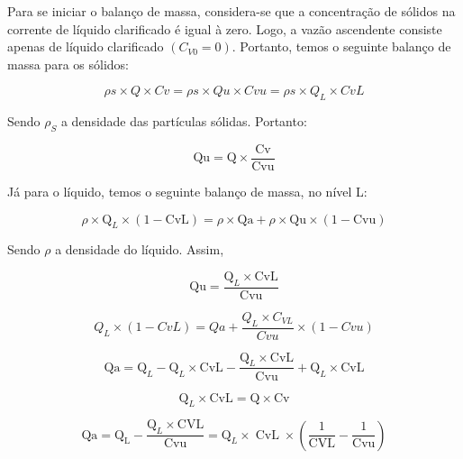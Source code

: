 Para se iniciar o balanço de massa, considera-se que a concentração de sólidos na corrente de líquido clarificado é igual à zero. Logo, a vazão ascendente consiste apenas de líquido clarificado $ (C_{V0} = 0) $. Portanto, temos o seguinte balanço de massa para os sólidos:

\begin{equation}\label{key}
\rho s \times Q \times C v=\rho s \times Q u \times C v u=\rho s \times Q_{L} \times C v L
\end{equation}


Sendo $\rho_{S}$ a densidade das partículas sólidas. Portanto:

\begin{equation}\label{key}
\mathrm{Qu}=\mathrm{Q} \times \frac{\mathrm{Cv}}{\mathrm{Cvu}}
\end{equation}

Já para o líquido, temos o seguinte balanço de massa, no nível L:

\begin{equation}\label{key}
\rho \times \mathrm{Q}_{L} \times(1-\mathrm{CvL})=\rho \times \mathrm{Qa}+\rho \times \mathrm{Qu} \times(1-\mathrm{Cvu})
\end{equation}

Sendo $\rho$ a densidade do líquido. 
Assim,

\begin{equation}\label{key}
\mathrm{Qu}=\frac{\mathrm{Q}_{L} \times \mathrm{CvL}}{\mathrm{Cvu}}
\end{equation}

\begin{equation}\label{key}
Q_{L} \times(1-C v L)=Q a+\frac{Q_{L} \times C_{V L}}{C v u} \times(1-C v u)
\end{equation}

\begin{equation}\label{key}
\mathrm{Qa}=\mathrm{Q}_{L}-\mathrm{Q}_{L} \times \mathrm{CvL}-\frac{\mathrm{Q}_{L} \times \mathrm{CvL}}{\mathrm{Cvu}}+\mathrm{Q}_{L} \times \mathrm{CvL}
\end{equation}

\begin{equation}\label{key}
\mathrm{Q}_{L} \times \mathrm{CvL}=\mathrm{Q} \times \mathrm{Cv}
\end{equation}

\begin{equation}\label{key}
\mathrm{Qa}=\mathrm{Q}_{\mathrm{L}}-\frac{\mathrm{Q}_{L} \times \mathrm{CVL}}{\mathrm{Cvu}}=\mathrm{Q}_{L} \times \operatorname{CvL} \times\left(\frac{1}{\mathrm{CVL}}-\frac{1}{\mathrm{Cvu}}\right)
\end{equation}

